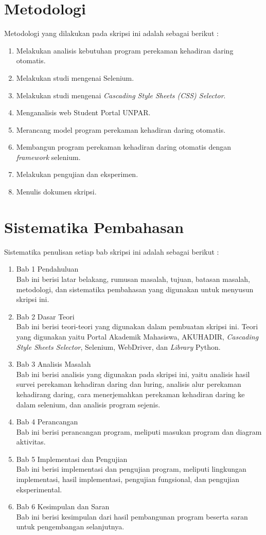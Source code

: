 \section{Metodologi}
\label{sec:metlit}
Metodologi yang dilakukan pada skripsi ini adalah sebagai berikut :
\begin{enumerate}
	\item Melakukan analisis kebutuhan program perekaman kehadiran daring otomatis.
	\item Melakukan studi mengenai Selenium.
	\item Melakukan studi mengenai \textit{Cascading Style Sheets (CSS) Selector}.
	\item Menganalisis web Student Portal UNPAR.
	\item Merancang model program perekaman kehadiran daring otomatis.
	\item Membangun program perekaman kehadiran daring otomatis dengan \textit{framework} selenium.
	\item Melakukan pengujian dan eksperimen.
	\item Menulis dokumen skripsi.		
\end{enumerate}


\section{Sistematika Pembahasan}
\label{sec:sispem}
Sistematika penulisan setiap bab skripsi ini adalah sebagai berikut :
\begin{enumerate}
	\item Bab 1 Pendahuluan \\
	Bab ini berisi latar belakang, rumusan masalah, tujuan, batasan masalah, metodologi, dan sistematika pembahasan yang digunakan untuk menyusun skripsi ini.
	\item Bab 2 Dasar Teori \\
	Bab ini berisi teori-teori yang digunakan dalam pembuatan skripsi ini. Teori yang digunakan yaitu Portal Akademik Mahasiswa, AKUHADIR, \textit{Cascading Style Sheets Selector}, Selenium, WebDriver, dan \textit{Library} Python.
	\item Bab 3 Analisis Masalah \\
	Bab ini berisi analisis yang digunakan pada skripsi ini, yaitu analisis hasil survei perekaman kehadiran daring dan luring, analisis alur perekaman kehadirang daring, cara menerjemahkan perekaman kehadiran daring ke dalam selenium, dan analisis program sejenis.
	\item Bab 4 Perancangan \\
	Bab ini berisi perancangan program, meliputi masukan program dan diagram aktivitas.
	\item Bab 5 Implementasi dan Pengujian\\
	Bab ini berisi implementasi dan pengujian program, meliputi lingkungan implementasi, hasil implementasi, pengujian fungsional, dan pengujian eksperimental.
	\item Bab 6 Kesimpulan dan Saran \\
	Bab ini berisi kesimpulan dari hasil pembangunan program beserta saran untuk pengembangan selanjutnya.
\end{enumerate}
